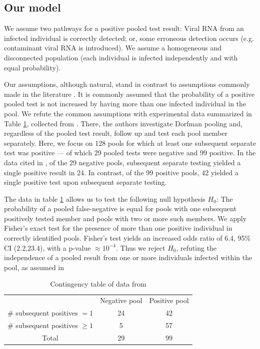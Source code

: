 \documentclass{article}
\begin{document}
\subsection{Our model}\label{subsec:ours}
We assume two pathways for a positive pooled test result: Viral RNA
from an infected individual is correctly detected; or, some erroneous
detection occurs (e.g. contaminant viral RNA is introduced). We assume
a homogeneous and disconnected population (each individual is infected
independently and with equal probability).

Our assumptions, although natural, stand in contrast to assumptions
commonly made in the literature \cite{Kim, Simplistic1, Simplistic2,
  OptimalDorfmanPool}. It is commonly assumed that the probability of
a positive pooled test is not increased by having more than one
infected individual in the pool. We refute the common assumptions with
experimental data summarized in Table \ref{table}, collected from
\cite{Salazar}. There, the authors investigate Dorfman pooling and,
regardless of the pooled test result, follow up and test each pool
member separately. Here, we focus on 128 pools for which at least one
subsequent separate test was positive --- of which 29 pooled tests
were negative and 99 positive. In the data cited in \cite{Salazar}, of
the 29 negative pools, subsequent separate testing yielded a single
positive result in 24. In contrast, of the 99 positive pools, 42
yielded a single positive test upon subsequent separate testing.

The data in table \ref{table} allows us to test the following null
hypothesis $H_0$: The probability of a pooled false-negative is equal
for pools with one subsequent positively tested member and pools with
two or more such members. We apply Fisher's exact test for the
presence of more than one positive individual in correctly identified
pools. Fisher's test yields an increased odds ratio of 6.4, 95\% CI
(2.2,23.4), with a p-value $\approx 10^{-4}$. Thus we reject $H_0$,
refuting the independence of a pooled result from one or more
individuals infected within the pool, as assumed in \cite{Simplistic1,
  Simplistic2, OptimalDorfmanPool, Kim}

\begin{table}[h]
\centering
\begin{tabular}{ c c c }
                                & Negative pool  & Positive pool \\%
\# subsequent positives $=1$    & 24             & 42            \\%
\# subsequent positives $\geq1$ & 5              & 57            \\%
 Total                          & 29             & 99            \\%
\end{tabular}
\caption{Contingency table of data from \cite{Salazar}}\label{table}
\end{table}
\end{document}
